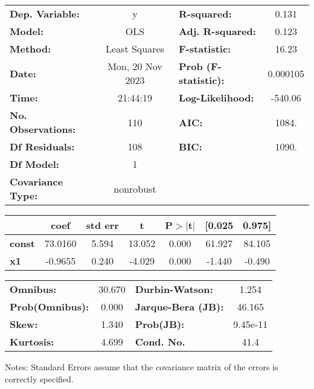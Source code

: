 \begin{center}
\begin{tabular}{lclc}
\toprule
\textbf{Dep. Variable:}    &        y         & \textbf{  R-squared:         } &     0.131   \\
\textbf{Model:}            &       OLS        & \textbf{  Adj. R-squared:    } &     0.123   \\
\textbf{Method:}           &  Least Squares   & \textbf{  F-statistic:       } &     16.23   \\
\textbf{Date:}             & Mon, 20 Nov 2023 & \textbf{  Prob (F-statistic):} &  0.000105   \\
\textbf{Time:}             &     21:44:19     & \textbf{  Log-Likelihood:    } &   -540.06   \\
\textbf{No. Observations:} &         110      & \textbf{  AIC:               } &     1084.   \\
\textbf{Df Residuals:}     &         108      & \textbf{  BIC:               } &     1090.   \\
\textbf{Df Model:}         &           1      & \textbf{                     } &             \\
\textbf{Covariance Type:}  &    nonrobust     & \textbf{                     } &             \\
\bottomrule
\end{tabular}
\begin{tabular}{lcccccc}
               & \textbf{coef} & \textbf{std err} & \textbf{t} & \textbf{P$> |$t$|$} & \textbf{[0.025} & \textbf{0.975]}  \\
\midrule
\textbf{const} &      73.0160  &        5.594     &    13.052  &         0.000        &       61.927    &       84.105     \\
\textbf{x1}    &      -0.9655  &        0.240     &    -4.029  &         0.000        &       -1.440    &       -0.490     \\
\bottomrule
\end{tabular}
\begin{tabular}{lclc}
\textbf{Omnibus:}       & 30.670 & \textbf{  Durbin-Watson:     } &    1.254  \\
\textbf{Prob(Omnibus):} &  0.000 & \textbf{  Jarque-Bera (JB):  } &   46.165  \\
\textbf{Skew:}          &  1.340 & \textbf{  Prob(JB):          } & 9.45e-11  \\
\textbf{Kurtosis:}      &  4.699 & \textbf{  Cond. No.          } &     41.4  \\
\bottomrule
\end{tabular}
\end{center}

Notes: \newline
 [1] Standard Errors assume that the covariance matrix of the errors is correctly specified.